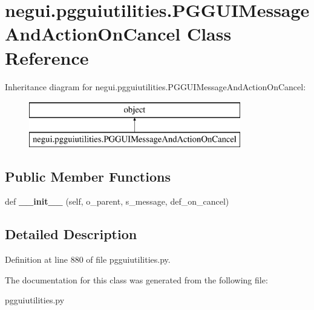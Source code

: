 \hypertarget{classnegui_1_1pgguiutilities_1_1PGGUIMessageAndActionOnCancel}{}\section{negui.\+pgguiutilities.\+P\+G\+G\+U\+I\+Message\+And\+Action\+On\+Cancel Class Reference}
\label{classnegui_1_1pgguiutilities_1_1PGGUIMessageAndActionOnCancel}
Inheritance diagram for negui.\+pgguiutilities.\+P\+G\+G\+U\+I\+Message\+And\+Action\+On\+Cancel\+:\begin{figure}[H]
\begin{center}
\leavevmode
\includegraphics[height=2.000000cm]{classnegui_1_1pgguiutilities_1_1PGGUIMessageAndActionOnCancel}
\end{center}
\end{figure}
\subsection*{Public Member Functions}
\begin{DoxyCompactItemize}
\item 
def {\bfseries \+\_\+\+\_\+init\+\_\+\+\_\+} (self, o\+\_\+parent, s\+\_\+message, def\+\_\+on\+\_\+cancel)\hypertarget{classnegui_1_1pgguiutilities_1_1PGGUIMessageAndActionOnCancel_a4274202cb2f6a6ef64a3928c9d433aff}{}\label{classnegui_1_1pgguiutilities_1_1PGGUIMessageAndActionOnCancel_a4274202cb2f6a6ef64a3928c9d433aff}

\end{DoxyCompactItemize}


\subsection{Detailed Description}


Definition at line 880 of file pgguiutilities.\+py.



The documentation for this class was generated from the following file\+:\begin{DoxyCompactItemize}
\item 
pgguiutilities.\+py\end{DoxyCompactItemize}
